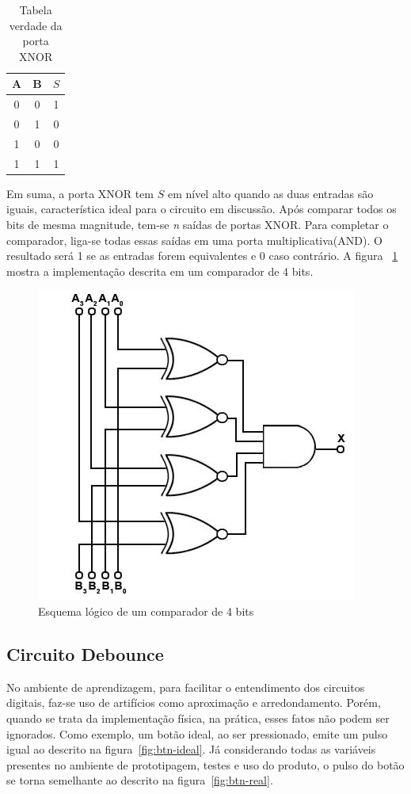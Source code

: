 \documentclass[12pt]{article}
\begin{document}
\begin{table}[!htbp]
\centering
\begin{tabular}{|c|c|c|}
	\hline
	A & B & $S$ \\
 \hline \hline
	0 & 0 & 1\\
	0 & 1 & 0\\
	1 & 0 & 0\\
	1 & 1 & 1\\
 \hline
\end{tabular}
\caption{Tabela verdade da porta XNOR \cite{tocci1997digital}}
\label{tab:verdade-xnor}
\end{table}

Em suma, a porta XNOR tem $S$ em nível alto quando as duas entradas são iguais, característica ideal para o circuito em discussão. Após comparar todos os bits de mesma magnitude, tem-se \textit{n} saídas de portas XNOR. Para completar o comparador, liga-se todas essas saídas em uma porta multiplicativa(AND). O resultado será 1 se as entradas forem equivalentes e 0 caso contrário\cite{ref-xnor}. A figura ~\ref{fig:portas-xnor} mostra a implementação descrita em um comparador de 4 bits.

\begin{figure}[!htbp]
\centering
\includegraphics[width=.4\textwidth]{img/comparador-xnor.jpeg}
\caption{Esquema lógico de um comparador de 4 bits\cite{ref-xnor}}
\label{fig:portas-xnor}
\end{figure}


\subsection{Circuito Debounce}

No ambiente de aprendizagem, para facilitar o entendimento dos circuitos digitais, faz-se uso de artifícios como aproximação e arredondamento. Porém, quando se trata da implementação física, na prática, esses fatos não podem ser ignorados. Como exemplo, um botão ideal, ao ser pressionado, emite um pulso igual ao descrito na figura~\ref{fig:btn-ideal}. Já considerando todas as variáveis presentes no ambiente de prototipagem, testes e uso do produto, o pulso do botão se torna semelhante ao descrito na figura~\ref{fig:btn-real}.
\end{document}
